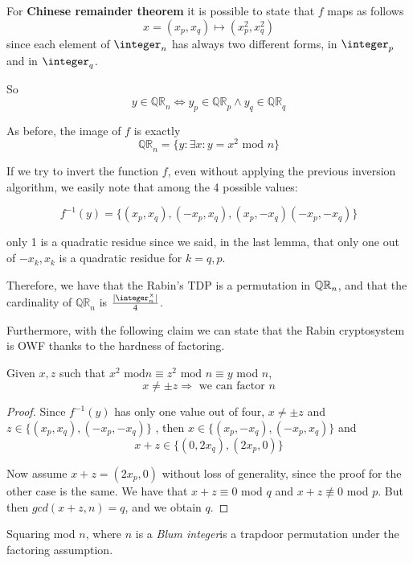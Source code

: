 For \textbf{Chinese remainder theorem} it is possible to state that $f$ maps as follows
\[
    x = (x_p, x_q) \mapsto (x^2_p, x^2_q)
\]
since each element of $\integer_n$ has always two different forms, in $\integer_p$ and in $\integer_q$.

So
\[
    y \in  \mathbb{QR}_{n} \Leftrightarrow y_{p} \in \mathbb{QR}_{p} \wedge y_{q} \in \mathbb{QR}_{q} 
\]

As before, the image of $f$ is exactly
\[
    \mathbb{QR}_{n} = \{ y: \exists x : y=x^{2} \text{ mod } n\}
\]

If we try to invert the function $f$, even without applying the previous inversion algorithm, we easily note that among the 4 possible values:

\[
    f^{-1}(y)=\{ (x_{p}, x_{q}),(-x_{p}, x_{q}),(x_{p},- x_{q})(-x_{p},- x_{q})\}
\]\label{les15:outoffour}

only 1 is a quadratic residue since we said, in the last lemma, that only one out of $-x_{k}, x_{k}$ is a quadratic residue for $k=q,p$.

Therefore, we have that the Rabin's TDP is a permutation in $\QR[n]$, and that the cardinality of $ \mathbb{QR}_{n} $ is $\frac{|\integer_n^\times|}{4}$.

Furthermore, with the following claim we can state that the Rabin cryptosystem is OWF thanks to the hardness of factoring.

\begin{claim}
    Given $x, z$ such that $x^{2}\text{ mod} n \equiv z^{2} \text{ mod } n
    \equiv y$ mod $n$,
    \[
        x \neq \pm z \Rightarrow \text{ we can factor } n
    \]
\end{claim}

\begin{proof}
    Since $f^{-1}(y)$ has only one value out of four, $x\neq \pm z$ and $z\in \{(x_{p},x_{q}),(-x_{p},-x_{q})\}$ , then $x \in \{(x_{p},-x_{q}),(-x_{p},x_{q})\}$ and 
    \[
        x + z \in \{(0,2x_{q}), (2x_{p}, 0)\}
    \]

    Now assume $x + z = (2x_{p}, 0)$ without loss of generality, since the proof for the other case is the same. We have that $x+z \equiv 0$ mod $q$ and $x+z \not\equiv 0 $ mod $p$. But then $gcd( x+z , n)=q$, and we obtain $q$.
\end{proof}

\begin{theorem}
    Squaring mod $n$, where $n$ is a \emph{Blum integer}\footnotemark is a trapdoor permutation under the factoring assumption.
\end{theorem}

